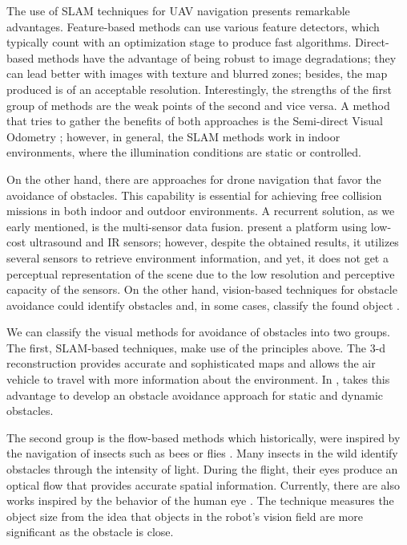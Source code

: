 The use of SLAM techniques for UAV navigation presents remarkable advantages. Feature-based methods can use various feature detectors, which typically count with an optimization stage to produce fast algorithms. Direct-based methods have the advantage of being robust to image degradations; they can lead better with images with texture and blurred zones; besides, the map produced is of an acceptable resolution. Interestingly, the strengths of the first group of methods are the weak points of the second and vice versa. A method that tries to gather the benefits of both approaches is the Semi-direct Visual Odometry \citep{Forster.Pizzoli.ea:ICRA:2014}; however, in general, the SLAM methods work in indoor environments, where the illumination conditions are static or controlled.

On the other hand, there are approaches for drone navigation that favor the avoidance of obstacles. This capability is essential for achieving free collision missions in both indoor and outdoor environments. A recurrent solution, as we early mentioned, is the multi-sensor data fusion. \cite{Gageik.Benz.ea:ACCESS:2015} present a platform using low-cost ultrasound and IR sensors; however, despite the obtained results, it utilizes several sensors to retrieve environment information, and yet, it does not get a perceptual representation of the scene due to the low resolution and perceptive capacity of the sensors. On the other hand, vision-based techniques for obstacle avoidance could identify obstacles and, in some cases, classify the found object \citep{Li.Ye.ea:IROS:2016}. 

We can classify the visual methods for avoidance of obstacles into two groups. The first, SLAM-based techniques, make use of the principles above. The 3-d reconstruction provides accurate and sophisticated maps and allows the air vehicle to travel with more information about the environment. In \citep{Moreno-Armendariz.Calvo:ICMEAE:2014}, takes this advantage to develop an obstacle avoidance approach for static and dynamic obstacles.

The second group is the flow-based methods which historically, were inspired by the navigation of insects such as bees \citep{Srinivasan.Gregory:PTBS:1992} or flies \citep{Franceschini.Ruffier.ea:InTech:2009}. Many insects in the wild identify obstacles through the intensity of light. During the flight, their eyes produce an optical flow that provides accurate spatial information. Currently, there are also works inspired by the behavior of the human eye \citep{Al-Kaff.Meng.ea:IVS:2016}. The technique measures the object size from the idea that objects in the robot's vision field are more significant as the obstacle is close.

